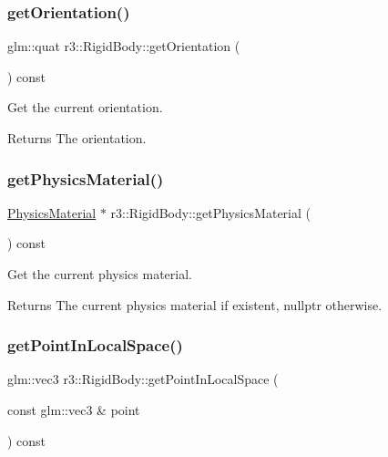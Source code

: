 \subsubsection{\texorpdfstring{get\+Orientation()}{getOrientation()}}
{\footnotesize\ttfamily glm\+::quat r3\+::\+Rigid\+Body\+::get\+Orientation (\begin{DoxyParamCaption}{ }\end{DoxyParamCaption}) const}



Get the current orientation. 

\begin{DoxyReturn}{Returns}
The orientation. 
\end{DoxyReturn}
\mbox{\label{classr3_1_1_rigid_body_a6a4de124959ef45fddb8809d60066ca9}} 
\subsubsection{\texorpdfstring{get\+Physics\+Material()}{getPhysicsMaterial()}}
{\footnotesize\ttfamily \mbox{\hyperlink{classr3_1_1_physics_material}{Physics\+Material}} $\ast$ r3\+::\+Rigid\+Body\+::get\+Physics\+Material (\begin{DoxyParamCaption}{ }\end{DoxyParamCaption}) const}



Get the current physics material. 

\begin{DoxyReturn}{Returns}
The current physics material if existent, nullptr otherwise. 
\end{DoxyReturn}
\mbox{\label{classr3_1_1_rigid_body_a23b72178cb04117c3b016218fefff835}} 
\subsubsection{\texorpdfstring{get\+Point\+In\+Local\+Space()}{getPointInLocalSpace()}}
{\footnotesize\ttfamily glm\+::vec3 r3\+::\+Rigid\+Body\+::get\+Point\+In\+Local\+Space (\begin{DoxyParamCaption}\item[{const glm\+::vec3 \&}]{point }\end{DoxyParamCaption}) const}



